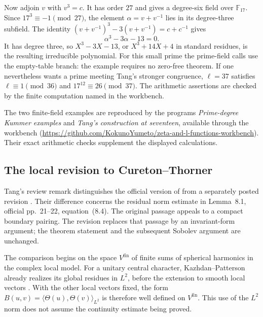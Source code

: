 \documentclass[11pt]{article}
\newcommand{\workbenchurl}{https://github.com/KokunoYumeto/zeta-and-l-functions-workbench}
\theoremstyle{definition}
\theoremstyle{remark}
\begin{document}
Now adjoin $v$ with $v^3=c$. It has order $27$ and gives a
degree-six field over $\mathbb F_{17}$. Since
$17^3\equiv-1\pmod{27}$, the element
$\alpha=v+v^{-1}$ lies in its degree-three subfield. The identity
$(v+v^{-1})^3-3(v+v^{-1})=c+c^{-1}$ gives
\[
 \alpha^3-3\alpha-13=0.
\]
It has degree three, so $X^3-3X-13$, or
$X^3+14X+4$ in standard residues, is the resulting irreducible
polynomial. For this small prime the prime-field calls use the
empty-table branch: the example requires no zero-free theorem.
If one nevertheless wants a prime meeting Tang's stronger
congruence, $\ell=37$ satisfies $\ell\equiv1\pmod{36}$ and
$17^{12}\equiv26\pmod{37}$. The arithmetic assertions are checked
by the finite computation named in the workbench.

The two finite-field examples are reproduced by the programs \emph{Prime-degree Kummer examples} and \emph{Tang's construction at seventeen}, available through the workbench (\url{\workbenchurl}). Their exact arithmetic checks supplement the displayed calculations.

\subsection{The local revision to Cureton--Thorner}

Tang's review remark \cite[Remark~1.3, p.~2]{Tang2026} distinguishes
the official version of \cite{CT2026} from a separately posted
revision \cite{TangCTReview2026}. Their difference concerns the
residual norm estimate in Lemma~8.1, official pp.~21--22,
equation~(8.4). The original passage appeals to a compact boundary
pairing. The revision replaces that passage by an invariant-form
argument; the theorem statement and the subsequent Sobolev argument
are unchanged.

The comparison begins on the space $V^{\mathrm{fin}}$ of finite
sums of spherical harmonics in the complex local model. For a
unitary central character, Kazhdan--Patterson already realizes its
global residues in $L^2$, before the extension to smooth local
vectors \cite[Theorem~II.1.4, pp.~114--117; Theorem~II.2.1 and the
preceding paragraph, p.~118]{KP1984}. With the other local vectors
fixed, the form
$B(u,v)=\langle\Theta(u),\Theta(v)\rangle_{L^2}$ is therefore
well defined on $V^{\mathrm{fin}}$. This use of the $L^2$ norm does
not assume the continuity estimate being proved.
\end{document}
